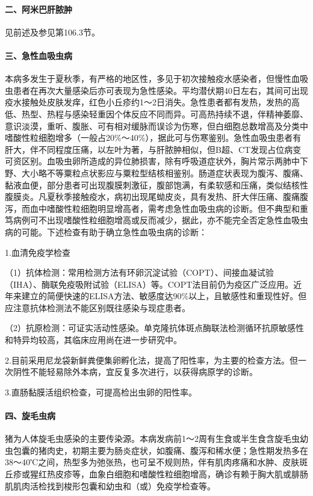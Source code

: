 \paragraph{二、阿米巴肝脓肿}

见前述及参见第106.3节。

\paragraph{三、急性血吸虫病}

本病多发生于夏秋季，有严格的地区性，多见于初次接触疫水感染者，但慢性血吸虫患者在再次大量感染后亦可表现为急性感染。平均潜伏期40日左右，其间可出现疫水接触处皮肤发痒，红色小丘疹约1～2日消失。急性患者都有发热，发热的高低、热型、热程与感染轻重因个体反应不同而异。可高热持续不退，伴精神萎靡、意识淡漠，重听、腹胀、可有相对缓脉而误诊为伤寒，但白细胞总数增高及分类中嗜酸性粒细胞增多（一般占20\%～40\%），据此可与伤寒鉴别。急性血吸虫患者有肝大，伴不同程度压痛，以左叶为著，与肝脓肿相似，但B超、CT发现占位病变可资区别。血吸虫卵所造成的异位肺损害，除有呼吸道症状外，胸片常示两肺中下野、大小略不等粟粒点状影应与粟粒型结核相鉴别。肠道症状表现为腹泻、腹痛、黏液血便，部分患者可出现腹膜刺激征，腹部饱满，有柔软感和压痛，类似结核性腹膜炎。凡夏秋季接触疫水，病初出现尾蚴皮炎，具有发热、肝大伴压痛、腹痛腹泻，而血中嗜酸性粒细胞明显增高者，需考虑急性血吸虫病的诊断。但不典型和重笃病例可不出现嗜酸性粒细胞增高或反而减少，据此，亦不能完全否定急性血吸虫病的可能。下述检查有助于确立急性血吸虫病的诊断：

1.血清免疫学检查

（1）抗体检测：常用检测方法有环卵沉淀试验（COPT）、间接血凝试验（IHA）、酶联免疫吸附试验（ELISA）等。COPT法目前仍为疫区广泛应用。近年来建立的简便快速的ELISA方法、敏感度达90\%以上，且敏感性和重现性好。但应注意抗体检测法不能区别既往感染与现症患者。

（2）抗原检测：可证实活动性感染。单克隆抗体斑点酶联法检测循环抗原敏感性和特异均较高，其临床应用尚在进一步研究中。

2.目前采用尼龙袋新鲜粪便集卵孵化法，提高了阳性率，为主要的检查方法。但一次阴性不能轻易除外本病，宜反复多次进行，以获得病原学的诊断。

3.直肠黏膜活组织检查，可提高检出虫卵的阳性率。

\paragraph{四、旋毛虫病}

猪为人体旋毛虫感染的主要传染源。本病发病前1～2周有生食或半生食含旋毛虫幼虫包囊的猪肉史，初期主要为肠炎症状，如腹痛、腹泻和稀水便；急性期发热多在38～40℃之间，热型多为弛张热，也可呈不规则热，伴有肌肉疼痛和水肿、皮肤斑丘疹或猩红热皮疹等，血象白细胞和嗜酸性粒细胞增高，确诊有赖于胸大肌或腓肠肌肌肉活检找到梭形包囊和幼虫和（或）免疫学检查等。

